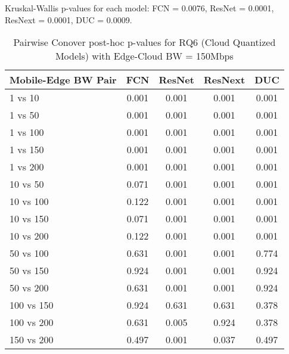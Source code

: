 \begin{table}[h]
\centering
\caption{Pairwise Conover post-hoc p-values for RQ6 (Cloud Quantized Models) with Edge-Cloud BW = 150Mbps}
\label{tab:conover_cloud_quantized_ec150}
\smallskip
Kruskal-Wallis p-values for each model: FCN = 0.0076, ResNet = 0.0001, ResNext = 0.0001, DUC = 0.0009.

\begin{tabular}{lcccc}
\toprule
Mobile-Edge BW Pair & FCN & ResNet & ResNext & DUC \\
\midrule
1 vs 10 & 0.001 & 0.001 & 0.001 & 0.001 \\
1 vs 50 & 0.001 & 0.001 & 0.001 & 0.001 \\
1 vs 100 & 0.001 & 0.001 & 0.001 & 0.001 \\
1 vs 150 & 0.001 & 0.001 & 0.001 & 0.001 \\
1 vs 200 & 0.001 & 0.001 & 0.001 & 0.001 \\
10 vs 50 & 0.071 & 0.001 & 0.001 & 0.001 \\
10 vs 100 & 0.122 & 0.001 & 0.001 & 0.001 \\
10 vs 150 & 0.071 & 0.001 & 0.001 & 0.001 \\
10 vs 200 & 0.122 & 0.001 & 0.001 & 0.001 \\
50 vs 100 & 0.631 & 0.001 & 0.001 & 0.774 \\
50 vs 150 & 0.924 & 0.001 & 0.001 & 0.924 \\
50 vs 200 & 0.631 & 0.001 & 0.001 & 0.924 \\
100 vs 150 & 0.924 & 0.631 & 0.631 & 0.378 \\
100 vs 200 & 0.631 & 0.005 & 0.924 & 0.378 \\
150 vs 200 & 0.497 & 0.001 & 0.037 & 0.497 \\
\bottomrule
\end{tabular}
\end{table}

